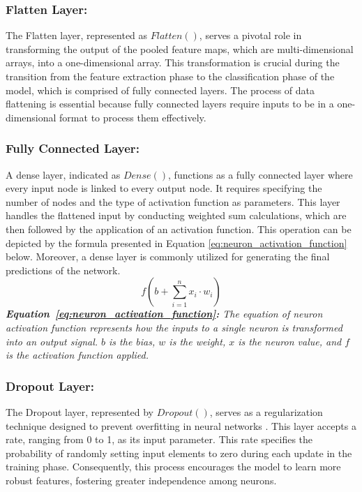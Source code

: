 \documentclass{l4proj}
\begin{document}
\subsubsection{Flatten Layer:}
The Flatten layer, represented as $Flatten()$, serves a pivotal role in transforming the output of the pooled feature maps, which are multi-dimensional arrays, into a one-dimensional array. This transformation is crucial during the transition from the feature extraction phase to the classification phase of the model, which is comprised of fully connected layers. The process of data flattening is essential because fully connected layers require inputs to be in a one-dimensional format to process them effectively.

\subsubsection{Fully Connected Layer:}
A dense layer, indicated as $Dense()$, functions as a fully connected layer where every input node is linked to every output node. It requires specifying the number of nodes and the type of activation function as parameters. This layer handles the flattened input by conducting weighted sum calculations, which are then followed by the application of an activation function. This operation can be depicted by the formula presented in Equation \ref{eq:neuron_activation_function} below. Moreover, a dense layer is commonly utilized for generating the final predictions of the network.
\begin{equation}
    f(b + \sum_{i=1}^{n} x_i \cdot w_i)
    \label{eq:neuron_activation_function}
\end{equation}
\textit{\textbf{Equation~\ref{eq:neuron_activation_function}:} The equation of neuron activation function represents how the inputs to a single neuron is transformed into an output signal.
$b$ is the bias, $w$ is the weight, $x$ is the neuron value, and $f$ is the activation function applied.}

\subsubsection{Dropout Layer:}
The Dropout layer, represented by $Dropout()$, serves as a regularization technique designed to prevent overfitting in neural networks \citep{dropout, dropout2}. This layer accepts a rate, ranging from 0 to 1, as its input parameter. This rate specifies the probability of randomly setting input elements to zero during each update in the training phase. Consequently, this process encourages the model to learn more robust features, fostering greater independence among neurons.
\end{document}
